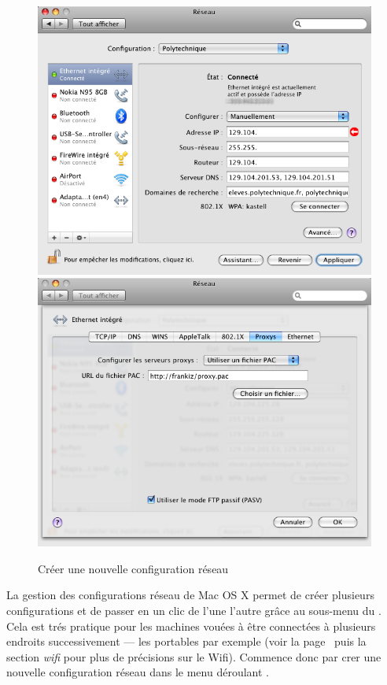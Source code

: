 \begin{figure}[!h]
\begin{center}
{\begin{minipage}{0.49 \textwidth}
\begin{flushright}
 		{\includegraphics[width=0.96 \textwidth]{images/mac_config_ip_leopard}} \\
 		{\includegraphics[width=0.96 \textwidth]{images/mac_config_proxy_leopard}}
\end{flushright}
 		\end{minipage}
 		 	\label{config:mac:ip:leopard}	}
     	 \caption{Créer une nouvelle configuration réseau}

    \end{center}
  \end{figure}

La gestion des configurations réseau de Mac OS X permet de créer plusieurs configurations et de passer en un clic de l'une  l'autre grâce au sous-menu  du . Cela est trés pratique pour les machines vouées à être connectées à plusieurs endroits successivement --- les portables par exemple (voir la page~\pageref{wifi} puis la section \emph{wifi} pour plus de précisions sur le Wifi). Commence donc par crer une nouvelle configuration réseau dans le menu déroulant .



